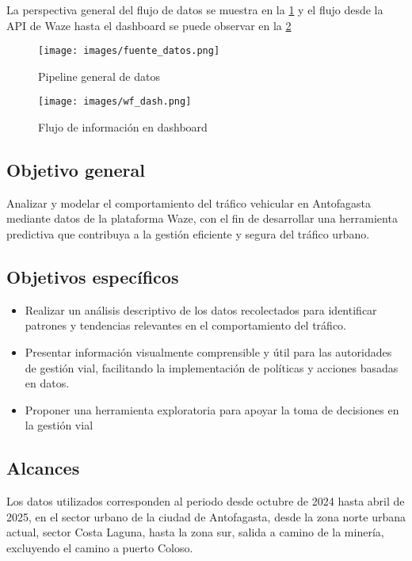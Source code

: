 \documentclass[12pt]{article}
\begin{document}
La perspectiva general del flujo de datos se muestra en la \cref{fig:fuente} y el flujo desde la API de Waze hasta el dashboard se puede observar en la \cref{fig:wf_dash}

\begin{figure}[H]
    \centering
    \texttt{[image: images/fuente\_datos.png]}
    \caption{Pipeline general de datos}
    \label{fig:fuente}
\end{figure}

\begin{figure}[H]
    \centering
    \texttt{[image: images/wf\_dash.png]}
    \caption{Flujo de información en dashboard}
    \label{fig:wf_dash}
\end{figure}


\subsection{Objetivo general}

Analizar y modelar el comportamiento del tráfico vehicular en Antofagasta mediante datos de la plataforma Waze, con el fin de desarrollar una herramienta predictiva que contribuya a la gestión eficiente y segura del tráfico urbano.

\subsection{Objetivos específicos}

\begin{itemize}
    \item Realizar un análisis descriptivo de los datos recolectados para identificar patrones y tendencias relevantes en el comportamiento del tráfico.
    \item Presentar información visualmente comprensible y útil para las autoridades de gestión vial, facilitando la implementación de políticas y acciones basadas en datos.
    \item Proponer una herramienta exploratoria para apoyar la toma de decisiones en la gestión vial
\end{itemize}

\subsection{Alcances}

Los datos utilizados corresponden al periodo desde octubre de 2024 hasta abril de 2025, en el sector urbano de la ciudad de Antofagasta, desde la zona norte urbana actual, sector Costa Laguna, hasta la zona sur, salida a camino de la minería, excluyendo el camino a puerto Coloso.
\end{document}
